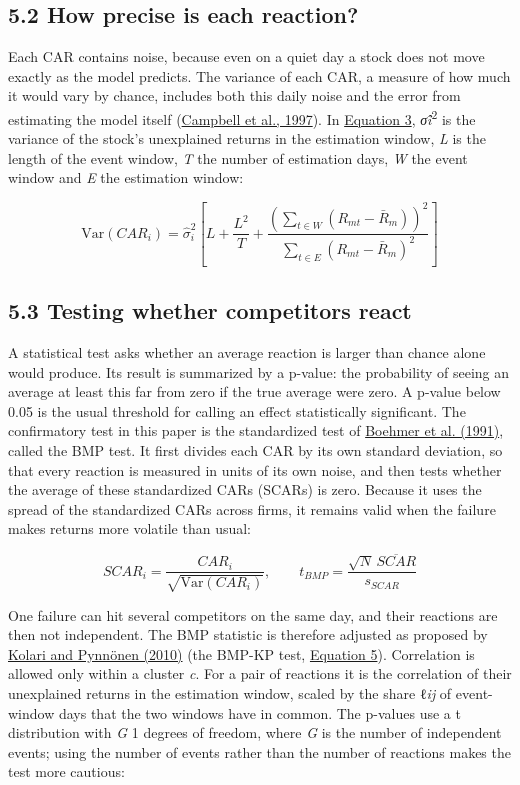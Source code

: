 \documentclass[12pt,a4paper]{article}
\begin{document}
\subsection*{5.2 How precise is each reaction?}
Each CAR contains noise, because even on a quiet day a stock does not move exactly as the model predicts. The variance of each CAR, a measure of how much it would vary by chance, includes both this daily noise and the error from estimating the model itself (\hyperlink{ref-campbell1997}{Campbell et al., 1997}). In \hyperlink{eq-3}{Equation 3}, \emph{σ̂}\emph{i}\textsuperscript{2} is the variance of the stock's unexplained returns in the estimation window, \emph{L} is the length of the event window, \emph{T} the number of estimation days, \emph{W} the event window and \emph{E} the estimation window:

\hypertarget{eq-3}{}\begin{equation}
\mathrm{Var}(CAR_i) = \hat\sigma_i^2\left[L + \frac{L^2}{T} + \frac{\left(\sum_{t\in W}(R_{mt}-\bar R_m)\right)^2}{\sum_{t\in E}(R_{mt}-\bar R_m)^2}\right]
\end{equation}

\subsection*{5.3 Testing whether competitors react}
A statistical test asks whether an average reaction is larger than chance alone would produce. Its result is summarized by a p-value: the probability of seeing an average at least this far from zero if the true average were zero. A p-value below 0.05 is the usual threshold for calling an effect statistically significant. The confirmatory test in this paper is the standardized test of \hyperlink{ref-boehmer1991}{Boehmer et al. (1991)}, called the BMP test. It first divides each CAR by its own standard deviation, so that every reaction is measured in units of its own noise, and then tests whether the average of these standardized CARs (SCARs) is zero. Because it uses the spread of the standardized CARs across firms, it remains valid when the failure makes returns more volatile than usual:

\hypertarget{eq-4}{}\begin{equation}
SCAR_i = \frac{CAR_i}{\sqrt{\mathrm{Var}(CAR_i)}}, \qquad t_{BMP} = \frac{\sqrt{N}\,\overline{SCAR}}{s_{SCAR}}
\end{equation}

One failure can hit several competitors on the same day, and their reactions are then not independent. The BMP statistic is therefore adjusted as proposed by \hyperlink{ref-kolari2010}{Kolari and Pynnönen (2010)} (the BMP-KP test, \hyperlink{eq-5}{Equation 5}). Correlation is allowed only within a cluster \emph{c}. For a pair of reactions it is the correlation of their unexplained returns in the estimation window, scaled by the share ℓ\emph{ij} of event-window days that the two windows have in common. The p-values use a t distribution with \emph{G} \textminus{} 1 degrees of freedom, where \emph{G} is the number of independent events; using the number of events rather than the number of reactions makes the test more cautious:
\end{document}
